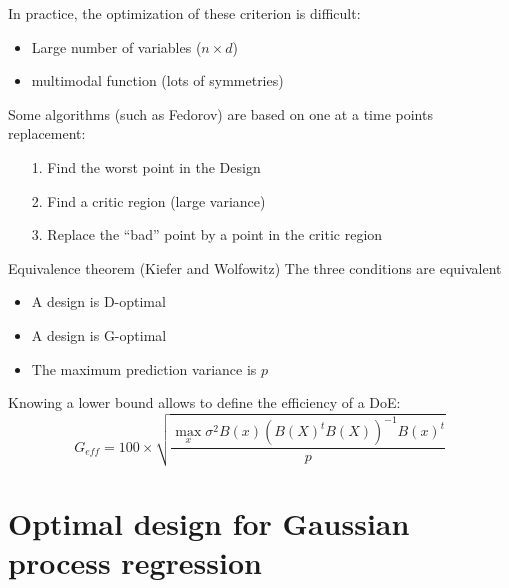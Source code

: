 \begin{frame}{}
In practice, the optimization of these criterion is difficult:
\begin{itemize}
	\item Large number of variables ($n \times d$)
	\item multimodal function (lots of symmetries)
\end{itemize}
\vspace{10mm}
Some algorithms (such as Fedorov) are based on one at a time points replacement:
\begin{itemize}
 	\item[1.] Find the worst point in the Design
 	\item[2.] Find a critic region (large variance)
 	\item[3.] Replace the ``bad'' point by a point in the critic region
 \end{itemize}
\end{frame}

\begin{frame}{}
\begin{block}{Equivalence theorem (Kiefer and Wolfowitz)}
The three conditions are equivalent
\begin{itemize}
 	\item A design is D-optimal
 	\item A design is G-optimal
 	\item The maximum prediction variance is $p$
 \end{itemize}
\end{block}
\vspace{5mm}
Knowing a lower bound allows to define the efficiency of a DoE:
$$G_{eff} = 100 \times \sqrt{ \frac{\max_x \sigma^2 B(x) (B(X)^t B(X))^{-1} B(x)^t}{p}}$$
\end{frame}

\section[Optimal DoE for GPR]{Optimal design for Gaussian process regression}
\subsection{}


